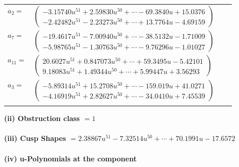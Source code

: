 \documentclass[1p]{elsarticle_modified}
\theoremstyle{definition}
\begin{document}
\begin{tabular}{m{7pt} m{180pt} m{7pt} m{180pt} }
\flushright $a_{2}=$&$\begin{pmatrix}-3.15740 u^{51}+2.59830 u^{50}+\cdots-69.3840 u+15.0376\\-2.42482 u^{51}-2.23273 u^{50}+\cdots+13.7764 u-4.69159\end{pmatrix}$ \\
\flushright $a_{7}=$&$\begin{pmatrix}-19.4617 u^{51}-7.00940 u^{50}+\cdots-38.5132 u-1.71009\\-5.98765 u^{51}-1.30763 u^{50}+\cdots-9.76296 u-1.01027\end{pmatrix}$ \\
\flushright $a_{11}=$&$\begin{pmatrix}20.6027 u^{51}+0.847073 u^{50}+\cdots+59.3495 u-5.42101\\9.18083 u^{51}+1.49344 u^{50}+\cdots+5.99447 u+3.56293\end{pmatrix}$ \\
\flushright $a_{3}=$&$\begin{pmatrix}-5.89314 u^{51}+15.2708 u^{50}+\cdots-159.019 u+41.0271\\-4.16919 u^{51}+2.82627 u^{50}+\cdots-34.0410 u+7.45539\end{pmatrix}$\\&\end{tabular}
\flushleft \textbf{(ii) Obstruction class $= 1$}\\~\\
\flushleft \textbf{(iii) Cusp Shapes $= 2.38867 u^{51}-7.32514 u^{50}+\cdots+70.1991 u-17.6572$}\\~\\
\newpage\renewcommand{\arraystretch}{1}
\flushleft \textbf{(iv) u-Polynomials at the component}\newline \\
\end{document}
